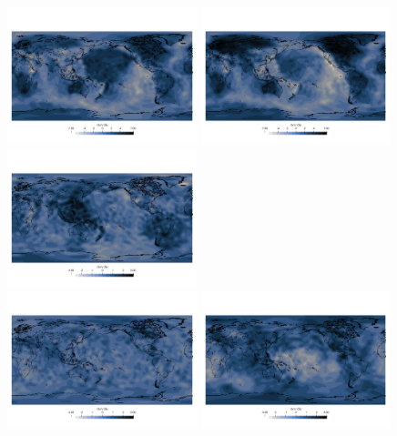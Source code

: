 \begin{center}
\includegraphics[width=5.5cm]{python_codes/fieldstone_85/images/fieldstone/fieldstone_S40RTS_25km.png}
\includegraphics[width=5.5cm]{python_codes/fieldstone_85/images/fieldstone/fieldstone_S40RTS_100km.png}
\includegraphics[width=5.5cm]{python_codes/fieldstone_85/images/fieldstone/fieldstone_S40RTS_600km.png}\\
\includegraphics[width=5.5cm]{python_codes/fieldstone_85/images/fieldstone/fieldstone_S40RTS_1500km.png}
\includegraphics[width=5.5cm]{python_codes/fieldstone_85/images/fieldstone/fieldstone_S40RTS_2800km.png}

\end{center}
